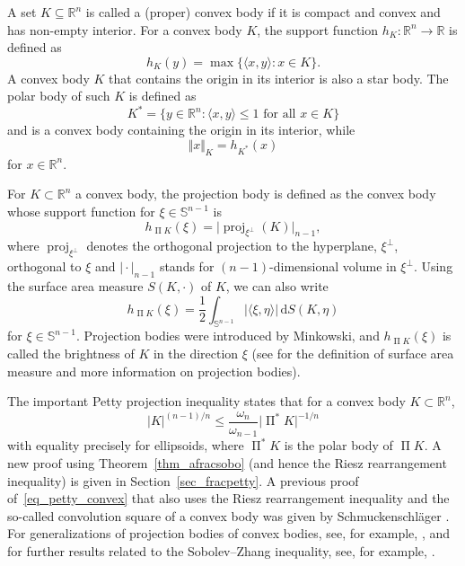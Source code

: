 \documentclass{amsart}
\newcommand{\opvtex}{\operatorname{\Pi}}
\newcommand{\opp}{\operatorname{\Pi}^*\!}
\newcommand{\snvtex}{{\mathbb S}^{n-1}}
\newcommand{\proj}{\operatorname{proj}}
\newcommand{\dvtex}{\,\mathrm{d}}
\newcommand{\vol}[1]{ \vert #1\vert}
\begin{document}
A set $K\subseteq \mathbb R^{n}$ is called a (proper) convex body if it
is compact and convex and has non-empty interior. For a convex body
$K$, the support function $h_{K}:\mathbb R^{n}\to \mathbb R$ is defined
as
%
\begin{equation*}
h_{K}(y)= \max \{\langle x,y\rangle : x\in K\}.
\end{equation*}
%
A convex body $K$ that contains the origin in its interior is also a star
body. The polar body of such $K$ is defined as
%
\begin{equation*}
K^{*}=\{y\in \mathbb R^{n}: \langle x,y\rangle \le 1 \text{ for all } x
\in K\}
\end{equation*}
%
and is a convex body containing the origin in its interior, while
%
\begin{equation*}
\Vert x\Vert _{K} = h_{K^{*}}(x)
\end{equation*}
%
for $x\in \mathbb R^{n}$.

For $K\subset \mathbb R^{n}$ a convex body, the projection body is defined
as the convex body whose support function for $\xi \in \snvtex $ is
%
\begin{equation}
h_{\opvtex K}(\xi )= \vol{\proj _{\xi ^{\perp}} (K)}_{n-1},
\nonumber \end{equation}
%
where $\proj _{\xi ^{\perp}}$ denotes the orthogonal projection to the
hyperplane, $\xi ^{\perp}$, orthogonal to $\xi $ and
$\vol{\cdot}_{n-1}$ stands for $(n-1)$-dimensional volume in
$\xi ^{\perp}$. Using the surface area measure $S(K, \cdot )$ of $K$, we
can also write
%
\begin{equation}
h_{\opvtex K}(\xi )= \frac {1}{2} \int _{\snvtex} \vert \langle \xi ,\eta
\rangle \vert \dvtex S(K,\eta )
\nonumber \end{equation}
%
for $\xi \in \snvtex $. Projection bodies were introduced by Minkowski, and
$h_{\opvtex K} (\xi )$ is called the brightness of $K$ in the direction
$\xi $ (see \cite{Gardner,Schneider:CB2} for the definition of surface
area measure and more information on projection bodies).


The important Petty projection inequality \cite{Petty} states that for
a convex body $K\subset \mathbb R^{n}$,
%
\begin{equation}
\label{eq_petty_convex}
\vol{ K}^{(n-1)/n}\le \frac{\omega _{n}}{\omega _{n-1}} \vol{\opp K}^{-
1/ n}
\end{equation}
%
with equality precisely for ellipsoids, where $\opp K$ is the polar body
of $\opvtex K$. A new proof using Theorem~\ref{thm_afracsobo} (and hence the
Riesz rearrangement inequality) is given in Section~\ref{sec_fracpetty}. A previous proof of~\eqref{eq_petty_convex} that also
uses the Riesz rearrangement inequality and the so-called convolution square
of a convex body was given by Schmuckenschl\"ager
\cite{Schmuckenschlager95}. For generalizations of projection bodies of
convex bodies, see, for example,
\cite{Boeroeczky2013,CLYZ2009,LRZ,Haberl:Schuster1,LYZ2000,LYZ2010b,Ludwig:Minkowski},
and for further results related to the Sobolev--Zhang inequality, see,
for example, \cite{HJM2016,LYZ2006,LYZ2002b,Nguyen16,Tuo_Wang:PSP}.
\end{document}
